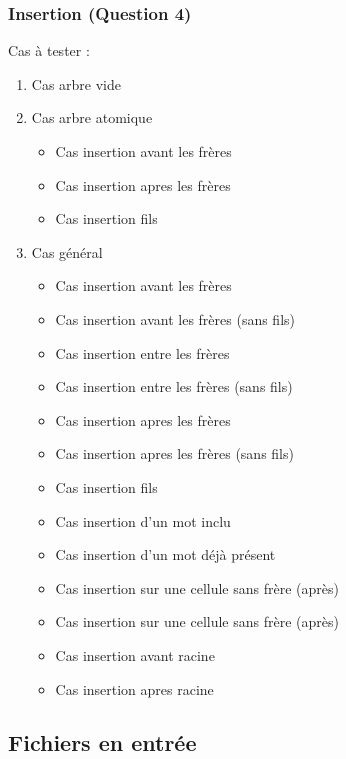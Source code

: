 \documentclass{report}
\newenvironment{myindentpar}[1]%
    {\begin{list}{}%
             {\setlength{\leftmargin}{#1}}%
             \item[]%
     }
     {\end{list}}
\begin{document}
\subsubsection{Insertion (Question 4)}
Cas à tester :
\begin{myindentpar}{2cm}
\begin{enumerate}
    \item Cas arbre vide
    \item Cas arbre atomique
        \begin{itemize}
            \item Cas insertion avant les frères
            \item Cas insertion apres les frères
            \item Cas insertion fils
        \end{itemize}
    \item Cas général
        \begin{itemize}
            \item Cas insertion avant les frères
            \item Cas insertion avant les frères (sans fils)
            \item Cas insertion entre les frères
            \item Cas insertion entre les frères (sans fils)
            \item Cas insertion apres les frères
            \item Cas insertion apres les frères (sans fils)
            \item Cas insertion fils
            \item Cas insertion d'un mot inclu
            \item Cas insertion d'un mot déjà présent
            \item Cas insertion sur une cellule sans frère (après)
            \item Cas insertion sur une cellule sans frère (après)
            \item Cas insertion avant racine
            \item Cas insertion apres racine
        \end{itemize}
    \end{enumerate}
\end{myindentpar}

\newpage
\subsection{Fichiers en entrée}
\end{document}
